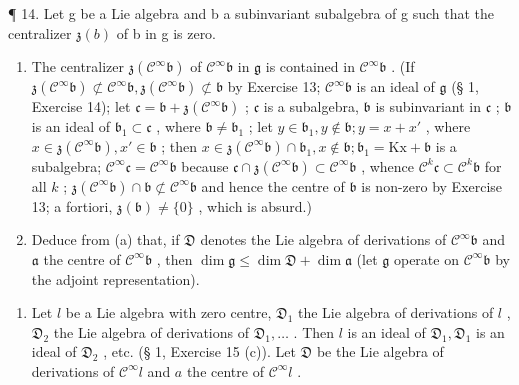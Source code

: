 ¶ 14. Let g be a Lie algebra and b a subinvariant subalgebra of g such that the centralizer \(\mathfrak{z}(b)\) of b in g is zero.

\begin{enumerate}
\def\labelenumi{(\alph{enumi})}
\item
  The centralizer \(\mathfrak{z}(\mathcal{C}^{\infty}\mathfrak{b})\) of \(\mathcal{C}^{\infty}\mathfrak{b}\) in \(\mathfrak{g}\) is contained in \(\mathcal{C}^{\infty}\mathfrak{b}\) . (If \(\mathfrak{z}(\mathcal{C}^{\infty}\mathfrak{b})\not\subset\mathcal{C}^{\infty}\mathfrak{b},\mathfrak{z}(\mathcal{C}^{\infty}\mathfrak{b})\not\subset\mathfrak{b}\) by Exercise 13; \(\mathcal{C}^{\infty}\mathfrak{b}\) is an ideal of \(\mathfrak{g}\) (§ 1, Exercise 14); let \(\mathfrak{c}=\mathfrak{b}+\mathfrak{z}(\mathcal{C}^{\infty}\mathfrak{b})\) ; \(\mathfrak{c}\) is a subalgebra, \(\mathfrak{b}\) is subinvariant in \(\mathfrak{c}\) ; \(\mathfrak{b}\) is an ideal of \(\mathfrak{b}_{1}\subset\mathfrak{c}\) , where \(\mathfrak{b}\neq\mathfrak{b}_{1}\) ; let \(y\in\mathfrak{b}_{1},y\notin\mathfrak{b};y=x+x'\) , where \(x\in\mathfrak{z}(\mathcal{C}^{\infty}\mathfrak{b}),x'\in\mathfrak{b}\) ; then \(x\in\mathfrak{z}(\mathcal{C}^{\infty}\mathfrak{b})\cap\mathfrak{b}_{1},x\notin\mathfrak{b};\mathfrak{b}_{1}=\mathrm{Kx}+\mathfrak{b}\) is a subalgebra; \(\mathcal{C}^{\infty}\mathfrak{c}=\mathcal{C}^{\infty}\mathfrak{b}\) because \(\mathfrak{c}\cap\mathfrak{z}(\mathcal{C}^{\infty}\mathfrak{b})\subset\mathcal{C}^{\infty}\mathfrak{b}\) , whence \(\mathcal{C}^{k}\mathfrak{c}\subset\mathcal{C}^{k}\mathfrak{b}\) for all \(k\) ; \(\mathfrak{z}(\mathcal{C}^{\infty}\mathfrak{b})\cap\mathfrak{b}\not\subset\mathcal{C}^{\infty}\mathfrak{b}\) and hence the centre of \(\mathfrak{b}\) is non-zero by Exercise 13; a fortiori, \(\mathfrak{z}(\mathfrak{b})\neq\{0\}\) , which is absurd.)
\item
  Deduce from (a) that, if \(\mathfrak{D}\) denotes the Lie algebra of derivations of \(\mathcal{C}^{\infty}\mathfrak{b}\) and \(\mathfrak{a}\) the centre of \(\mathcal{C}^{\infty}\mathfrak{b}\) , then \(\dim \mathfrak{g} \leqslant \dim \mathfrak{D} + \dim \mathfrak{a}\) (let \(\mathfrak{g}\) operate on \(\mathcal{C}^{\infty}\mathfrak{b}\) by the adjoint representation).
\end{enumerate}

\begin{enumerate}
\def\labelenumi{\arabic{enumi}.}
\setcounter{enumi}{14}
\tightlist
\item
  Let \(l\) be a Lie algebra with zero centre, \(\mathfrak{D}_1\) the Lie algebra of derivations of \(l\) , \(\mathfrak{D}_2\) the Lie algebra of derivations of \(\mathfrak{D}_1, \ldots\) . Then \(l\) is an ideal of \(\mathfrak{D}_1, \mathfrak{D}_1\) is an ideal of \(\mathfrak{D}_2\) , etc. (§ 1, Exercise 15 (c)). Let \(\mathfrak{D}\) be the Lie algebra of derivations of \(\mathcal{C}^\infty l\) and \(a\) the centre of \(\mathcal{C}^\infty l\) .
\end{enumerate}

